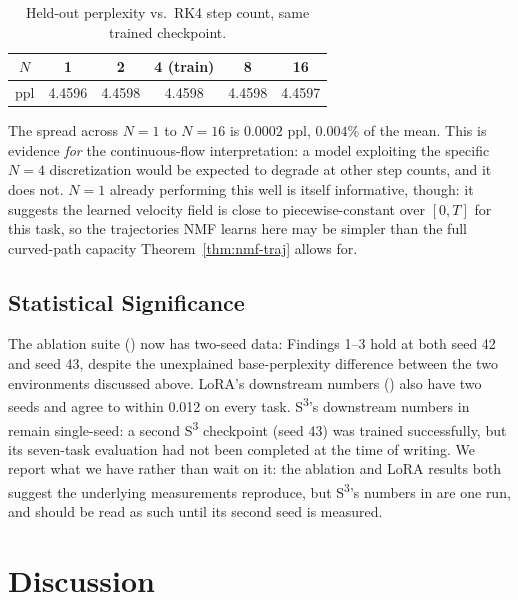 \documentclass{scpe}
\newcommand{\sthree}{S\textsuperscript{3}}
\begin{document}
\begin{table}[t]
\centering
\caption{Held-out perplexity vs.\ RK4 step count, same trained checkpoint.}
\label{tab:ode-invariance}
\footnotesize
\begin{tabular}{@{}cccccc@{}}
\toprule
$N$ & 1 & 2 & 4 (train) & 8 & 16 \\
\midrule
ppl & 4.4596 & 4.4598 & 4.4598 & 4.4598 & 4.4597 \\
\bottomrule
\end{tabular}
\end{table}

The spread across $N=1$ to $N=16$ is $0.0002$ ppl, $0.004\%$ of the mean. This is evidence \emph{for} the continuous-flow interpretation: a model exploiting the specific $N{=}4$ discretization would be expected to degrade at other step counts, and it does not. $N{=}1$ already performing this well is itself informative, though: it suggests the learned velocity field is close to piecewise-constant over $[0,T]$ for this task, so the trajectories NMF learns here may be simpler than the full curved-path capacity Theorem~\ref{thm:nmf-traj} allows for.

\subsection{Statistical Significance}
\label{sec:stats}

The ablation suite () now has two-seed data: Findings 1--3 hold at both seed 42 and seed 43, despite the unexplained base-perplexity difference between the two environments discussed above. LoRA's downstream numbers () also have two seeds and agree to within 0.012 on every task. \sthree{}'s downstream numbers in  remain single-seed: a second \sthree{} checkpoint (seed 43) was trained successfully, but its seven-task evaluation had not been completed at the time of writing. We report what we have rather than wait on it: the ablation and LoRA results both suggest the underlying measurements reproduce, but \sthree{}'s numbers in  are one run, and should be read as such until its second seed is measured.

\section{Discussion}
\label{sec:discussion}
\end{document}
